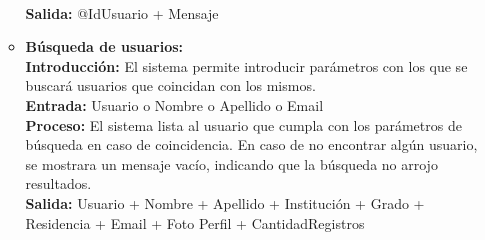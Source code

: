\begin{enumerate}[A.]
\begin{itemize}
            \\ \textbf{Salida:} @IdUsuario + Mensaje
            \\
          \item \textbf{Búsqueda de usuarios:}
            \\ \textbf{Introducción:} El sistema permite introducir parámetros con los que se buscará usuarios que coincidan con los mismos.
            \\ \textbf{Entrada:} Usuario o Nombre o Apellido o Email
            \\ \textbf{Proceso:} El sistema lista al usuario que cumpla con los parámetros de búsqueda en caso de coincidencia. En caso de no encontrar algún usuario, se mostrara un mensaje vacío, indicando que la búsqueda no arrojo resultados.
            \\ \textbf{Salida:} Usuario + Nombre + Apellido + Institución + Grado + Residencia + Email + Foto Perfil + CantidadRegistros
            \\
        \end{itemize}


\end{enumerate}
